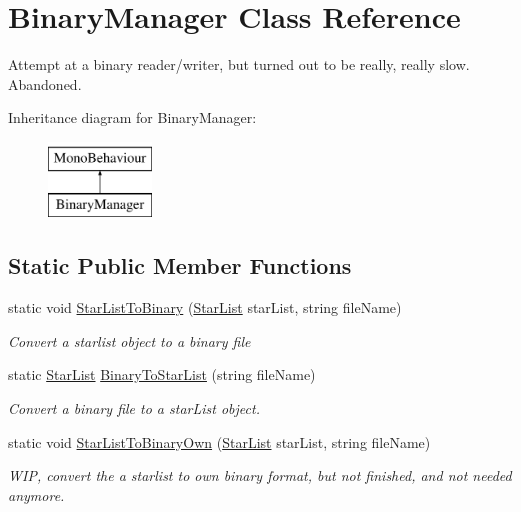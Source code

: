 \hypertarget{class_binary_manager}{}\section{Binary\+Manager Class Reference}
\label{class_binary_manager}


Attempt at a binary reader/writer, but turned out to be really, really slow. Abandoned.  


Inheritance diagram for Binary\+Manager\+:\begin{figure}[H]
\begin{center}
\leavevmode
\includegraphics[height=2.000000cm]{class_binary_manager}
\end{center}
\end{figure}
\subsection*{Static Public Member Functions}
\begin{DoxyCompactItemize}
\item 
static void \mbox{\hyperlink{class_binary_manager_a5ed7a73e8b658af239df501ef664cf1d}{Star\+List\+To\+Binary}} (\mbox{\hyperlink{class_star_list}{Star\+List}} star\+List, string file\+Name)
\begin{DoxyCompactList}\small\item\em Convert a starlist object to a binary file \end{DoxyCompactList}\item 
static \mbox{\hyperlink{class_star_list}{Star\+List}} \mbox{\hyperlink{class_binary_manager_aa2640924cb02371025d1741cdfafeacf}{Binary\+To\+Star\+List}} (string file\+Name)
\begin{DoxyCompactList}\small\item\em Convert a binary file to a star\+List object. \end{DoxyCompactList}\item 
static void \mbox{\hyperlink{class_binary_manager_a7a9e6671eb7c5a003e5f0d1959268d5d}{Star\+List\+To\+Binary\+Own}} (\mbox{\hyperlink{class_star_list}{Star\+List}} star\+List, string file\+Name)
\begin{DoxyCompactList}\small\item\em W\+IP, convert the a starlist to own binary format, but not finished, and not needed anymore. \end{DoxyCompactList}\end{DoxyCompactItemize}


